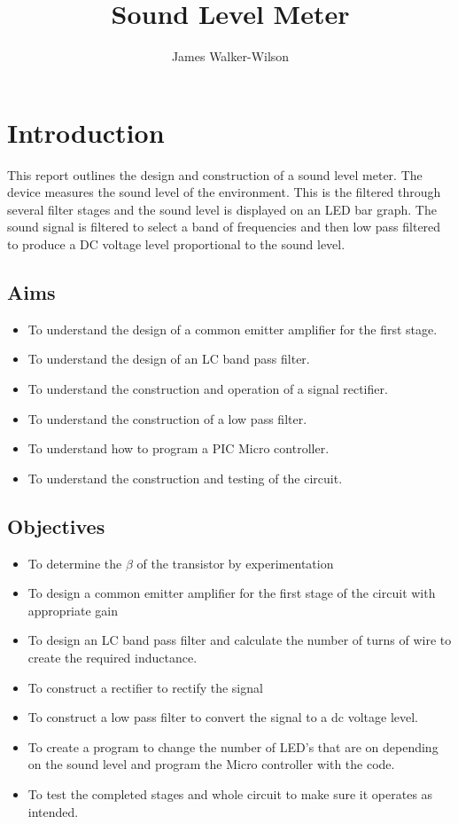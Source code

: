 \documentclass[10pt,a4paper]{article}
\author{James Walker-Wilson}
\title{Sound Level Meter}
\begin{document}
\maketitle
\newpage

\begin{abstract}

\end{abstract}

\section{Introduction}
This report outlines the design and construction of a sound level meter. The device measures the sound level of the environment. This is the filtered through several filter stages and the sound level is displayed on an LED bar graph. The sound signal is filtered to select a band of frequencies and then low pass filtered to produce a DC voltage level proportional to the sound level.  

\subsection{Aims}
\begin{itemize}
  \item To understand the design of a common emitter amplifier for the first stage.
  \item To understand the design of an LC band pass filter.
  \item To understand the construction and operation of a signal rectifier.
  \item To understand the construction of a low pass filter.
  \item To understand how to program a PIC Micro controller.
  \item To understand the construction and testing of the circuit.  

  \end{itemize}

\subsection{Objectives}
\begin{itemize}
  \item To determine the $\beta$ of the transistor by experimentation
  \item To design a common emitter amplifier for the first stage of the circuit with appropriate gain
  \item To design an LC band pass filter and calculate the number of turns of wire to create the required inductance.
  \item To construct a rectifier to rectify the signal
  \item To construct a low pass filter to convert the signal to a dc voltage level.
  \item To create a program to change the number of LED's that are on depending on the sound level and program the Micro controller with the code.
  \item To test the completed stages and whole circuit to make sure it operates as intended.  

  \end{itemize}
\end{document}

